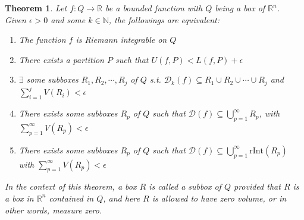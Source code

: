 \documentclass[11pt,oneside]{book}
\theoremstyle{break}
\theoremstyle{break}
\newtheorem{thm}{Theorem}[section]
\newcommand{\R}{\mathbb{R}}
\newcommand{\N}{\mathbb{N}}
\newcommand{\D}{\mathcal{D}}
\begin{document}
\begin{thm}
Let $f:Q \to \R$ be a bounded function with $Q$ being a box of $\R^n$.\\ Given $\epsilon>0$ and some $k \in \N$, the followings are equivalent:
\begin{enumerate}[topsep=3pt,itemsep=-1ex,partopsep=1ex,parsep=1ex]
\item The function $f$ is Riemann integrable on $Q$
\item There exists a partition $P$ such that $U(f,P) < L(f,P) + \epsilon$
\item $\exists$ some subboxes $R_1,R_2,\cdots, R_j$ of $Q$ s.t. $\D_k(f) \subseteq R_1\cup R_2\cup\cdots\cup R_j$ and $\sum_{i=1}^j V(R_i) <\epsilon$ 
\item There exists some subboxes $R_p$ of $Q$ such that $\D(f) \subseteq \bigcup_{p=1}^\infty R_p$, with $\sum_{p=1}^\infty V(R_p) < \epsilon$
\item There exists some subboxes $R_p$ of $Q$ such that $\D(f) \subseteq \bigcup_{p=1}^\infty \text{rInt}(R_p)$ with $\sum_{p=1}^\infty V(R_p) < \epsilon$
\end{enumerate}
In the context of this theorem, a box $R$ is called a subbox of $Q$ provided that $R$ is a box in $\R^n$ contained in $Q$, and here $R$ is allowed to have zero volume, or in other words, measure zero.
\end{thm}
\end{document}

